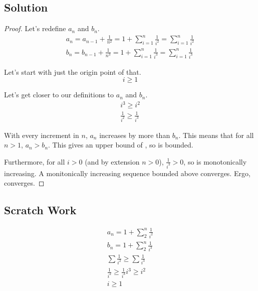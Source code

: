\documentclass[12pt]{report}
\begin{document}
    \subsection{Solution}
        \begin{proof}
            Let's redefine $a_n$ and $b_n$.
            \begin{gather}
                a_n =   a_{n - 1} + \frac{1}{n^2}
                    =   1 + \sum_{i = 1}^{n} \frac{1}{i^2}
                    =   \sum_{i = 1}^{n} \frac{1}{i^2}\\
                b_n =   b_{n - 1} + \frac{1}{n^3}
                    =   1 + \sum_{i = 1}^{n} \frac{1}{i^3}
                    =   \sum_{i = 1}^{n} \frac{1}{i^3}
            \end{gather}

            Let's start with just the origin point of that.
            \begin{equation}
                i \geq 1
            \end{equation}

            Let's get closer to our definitions to $a_n$ and $b_n$.
            \begin{gather}
                i^3 \geq i^2\\
                \frac{1}{i^2} \geq \frac{1}{i^3}
            \end{gather}

            With every increment in $n$, $a_n$ increases by more than $b_n$.
            This means that for all $n > 1$, $a_n > b_n$.
            This gives  an upper bound of , so  is bounded.
            
            Furthermore, for all $i > 0$ (and by extension $n > 0$), $\frac{1}{i^3} > 0$, so  is monotonically increasing.
            A monitonically increasing sequence bounded above converges.
            Ergo,  converges.
        \end{proof}

    \subsection*{Scratch Work}
        \begin{gather*}
            a_n = 1 + \sum_{2}^{n} \frac{1}{i^2}\\
            b_n = 1 + \sum_{2}^{n} \frac{1}{i^3}\\
            \sum \frac{1}{i^2} \geq \sum\frac{1}{i^3}\\
            \frac{1}{i^2} \geq \frac{1}{i^3}
            i^3 \geq i^2\\
            i \geq 1
        \end{gather*}
\end{document}
